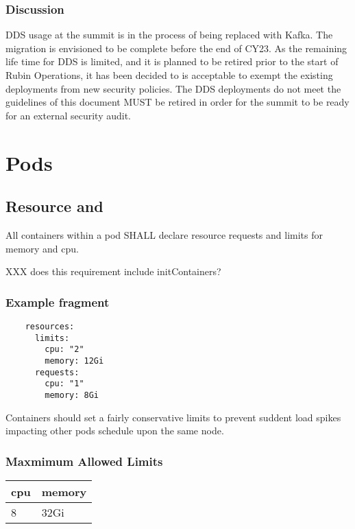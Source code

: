 \documentclass[PMO,authoryear,toc]{lsstdoc}
\begin{document}
\subsubsection{Discussion}

DDS usage at the summit is in the process of being replaced with Kafka.
The migration is envisioned to be complete before the end of CY23.
As the remaining life time for DDS is limited, and it is planned to be retired prior to the start of Rubin Operations, it has been decided to is acceptable to exempt the existing deployments from new security policies.
The DDS deployments do not meet the guidelines of this document MUST be retired in order for the summit to be ready for an external security audit.


\section{Pods}\label{sec:pod}

\subsection{Resource  and }

All containers within a pod SHALL declare resource requests and limits for memory and cpu.

XXX does this requirement include initContainers?

\subsubsection{Example  fragment}

\begin{verbatim}
    resources:
      limits:
        cpu: "2"
        memory: 12Gi
      requests:
        cpu: "1"
        memory: 8Gi
\end{verbatim}

Containers should set a fairly conservative limits to prevent suddent load spikes impacting other pods schedule upon the same node.

\subsubsection{Maxmimum Allowed Limits}

\begin{center}
\begin{tabular}{|l|l|}
\hline
    \bf cpu & \bf memory \\ \hline
    8 & 32Gi \\ \hline
\end{tabular}
\end{center}
\end{document}
